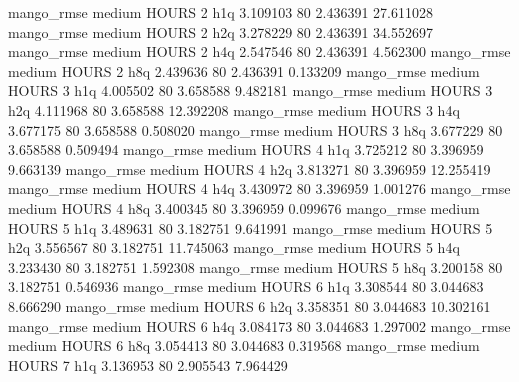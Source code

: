        mango_rmse     medium    HOURS                 2                  h1q  3.109103 80       2.436391          27.611028
       mango_rmse     medium    HOURS                 2                  h2q  3.278229 80       2.436391          34.552697
       mango_rmse     medium    HOURS                 2                  h4q  2.547546 80       2.436391           4.562300
       mango_rmse     medium    HOURS                 2                  h8q  2.439636 80       2.436391           0.133209
       mango_rmse     medium    HOURS                 3                  h1q  4.005502 80       3.658588           9.482181
       mango_rmse     medium    HOURS                 3                  h2q  4.111968 80       3.658588          12.392208
       mango_rmse     medium    HOURS                 3                  h4q  3.677175 80       3.658588           0.508020
       mango_rmse     medium    HOURS                 3                  h8q  3.677229 80       3.658588           0.509494
       mango_rmse     medium    HOURS                 4                  h1q  3.725212 80       3.396959           9.663139
       mango_rmse     medium    HOURS                 4                  h2q  3.813271 80       3.396959          12.255419
       mango_rmse     medium    HOURS                 4                  h4q  3.430972 80       3.396959           1.001276
       mango_rmse     medium    HOURS                 4                  h8q  3.400345 80       3.396959           0.099676
       mango_rmse     medium    HOURS                 5                  h1q  3.489631 80       3.182751           9.641991
       mango_rmse     medium    HOURS                 5                  h2q  3.556567 80       3.182751          11.745063
       mango_rmse     medium    HOURS                 5                  h4q  3.233430 80       3.182751           1.592308
       mango_rmse     medium    HOURS                 5                  h8q  3.200158 80       3.182751           0.546936
       mango_rmse     medium    HOURS                 6                  h1q  3.308544 80       3.044683           8.666290
       mango_rmse     medium    HOURS                 6                  h2q  3.358351 80       3.044683          10.302161
       mango_rmse     medium    HOURS                 6                  h4q  3.084173 80       3.044683           1.297002
       mango_rmse     medium    HOURS                 6                  h8q  3.054413 80       3.044683           0.319568
       mango_rmse     medium    HOURS                 7                  h1q  3.136953 80       2.905543           7.964429
